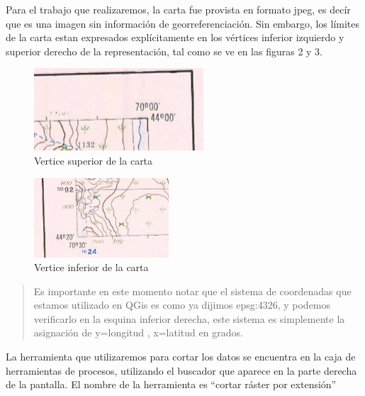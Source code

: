 \documentclass[12pt,]{extarticle}
\begin{document}
Para el trabajo que realizaremos, la carta fue provista en formato jpeg,
es decír que es una imagen sin información de georreferenciación. Sin
embargo, los límites de la carta estan expresados explícitamente en los
vértices inferior izquierdo y superior derecho de la representación, tal
como se ve en las figuras 2 y 3.

\begin{figure}
\centering
\includegraphics[width=2.48958in,height=1.2079in]{../img/image2.png}
\caption{Vertice superior de la carta}
\end{figure}

\begin{figure}
\centering
\includegraphics[width=1.97676in,height=1.16667in]{../img/image3.png}
\caption{Vertice inferior de la carta}
\end{figure}

\begin{quote}
Es importante en este momento notar que el sistema de coordenadas que
estamos utilizado en QGis es como ya dijimos epsg:4326, y podemos
verificarlo en la esquina inferior derecha, este sistema es simplemente
la asignación de y=longitud , x=latitud en grados.
\end{quote}

La herramienta que utilizaremos para cortar los datos se encuentra en la
caja de herramientas de procesos, utilizando el buscador que aparece en
la parte derecha de la pantalla. El nombre de la herramienta es ``cortar
ráster por extensión''
\end{document}
